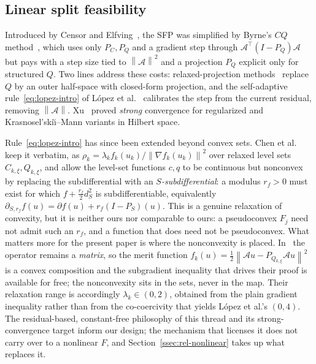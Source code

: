 \documentclass[]{interact}
\theoremstyle{plain}
\theoremstyle{definition}
\theoremstyle{remark}
\newcommand{\norm}[1]{\left\lVert #1 \right\rVert}
\begin{document}
\subsection{Linear split feasibility}\label{ssec:rel-linear}
Introduced by Censor and Elfving~\citep{censor1994}, the SFP was simplified by
Byrne's $CQ$ method~\citep{byrne2002}, which uses only $P_C,P_Q$ and a gradient step through
$\mathcal{A}^{\top}(I-P_Q)\mathcal{A}$ but pays with a step size tied to $\norm{\mathcal{A}}^2$
and a projection $P_Q$ explicit only for structured $Q$. Two lines address these costs:
relaxed-projection methods~\citep{fukushima1986,yang2004} replace $Q$ by an outer half-space with
closed-form projection, and the self-adaptive rule~\eqref{eq:lopez-intro} of L\'opez et
al.~\citep{lopez2012} calibrates the step from the current residual, removing
$\norm{\mathcal{A}}$. Xu~\citep{xu2010} proved \emph{strong} convergence for regularized and
Krasnosel'ski\u{\i}--Mann variants in Hilbert space.

Rule~\eqref{eq:lopez-intro} has since been extended beyond convex sets. Chen et
al.~\citep{chen2019ssub} keep it verbatim, as $\rho_k=\lambda_k f_k(u_k)/\norm{\nabla f_k(u_k)}^2$
over relaxed level sets $C_{k,\xi},Q_{k,\xi}$, and allow the level-set functions $c,q$ to be
continuous but nonconvex by replacing the subdifferential with an \emph{$S$-subdifferential}: a
modulus $r_f>0$ must exist for which $f+\tfrac{r_f}{2}d_S^2$ is subdifferentiable, equivalently
$\partial_{S,r_f}f(u)=\partial f(u)+r_f(I-P_S)(u)$. This is a genuine relaxation of convexity, but
it is neither ours nor comparable to ours: a pseudoconvex $F_j$ need not admit such an $r_f$, and a
function that does need not be pseudoconvex. What matters more for the present paper is where the
nonconvexity is placed. In~\citep{chen2019ssub} the operator remains a \emph{matrix}, so the merit
function $f_k(u)=\tfrac12\norm{\mathcal{A}u-P_{Q_{k,\xi}}\mathcal{A}u}^2$ is a convex composition
and the subgradient inequality that drives their proof is available for free; the nonconvexity
sits in the sets, never in the map. Their relaxation range is accordingly $\lambda_k\in(0,2)$,
obtained from the plain gradient inequality rather than from the co-coercivity that yields
L\'opez et al.'s $(0,4)$. The residual-based, constant-free philosophy of this thread and its
strong-convergence target inform our design; the mechanism that licenses it does not carry over to
a nonlinear $F$, and Section~\ref{ssec:rel-nonlinear} takes up what replaces it.
\end{document}
